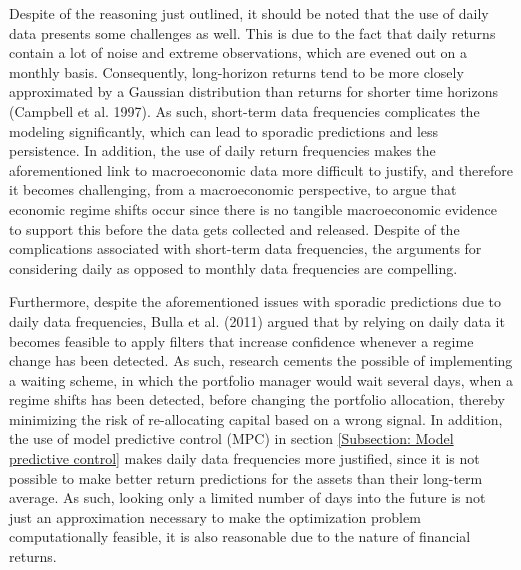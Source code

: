 Despite of the reasoning just outlined, it should be noted that the use of daily data presents some challenges as well. This is due to the fact that daily returns contain a lot of noise and extreme observations, which are evened out on a monthly basis. Consequently, long-horizon returns tend to be more closely approximated by a Gaussian distribution than returns for shorter time horizons (Campbell et al. 1997). As such, short-term data frequencies complicates the modeling significantly, which can lead to sporadic predictions and less persistence. In addition, the use of daily return frequencies makes the aforementioned link to macroeconomic data more difficult to justify, and therefore it becomes challenging, from a macroeconomic perspective, to argue that economic regime shifts occur since there is no tangible macroeconomic evidence to support this before the data gets collected and released. Despite of the complications associated with short-term data frequencies, the arguments for considering daily as opposed to monthly data frequencies are compelling. 

Furthermore, despite the aforementioned issues with sporadic predictions due to daily data frequencies, Bulla et al. (2011) argued that by relying on daily data it becomes feasible to apply filters that increase confidence whenever a regime change has been detected. As such, research cements the possible of implementing a waiting scheme, in which the portfolio manager would wait several days, when a regime shifts has been detected, before changing the portfolio allocation, thereby minimizing the risk of re-allocating capital based on a wrong signal. In addition, the use of model predictive control (MPC) in section \ref{Subsection: Model predictive control} makes daily data frequencies more justified, since it is not possible to make better return predictions for the assets than their long-term average. As such, looking only a limited number of days into the future is not just an approximation necessary to make the optimization problem computationally feasible, it is also reasonable due to the nature of financial returns.

